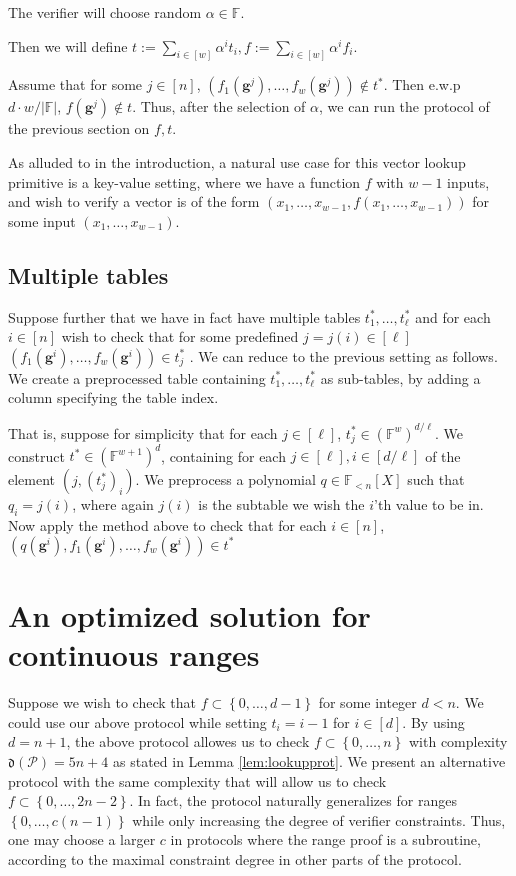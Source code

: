 \documentclass[11pt]{article} %
\newcommand{\F}{\ensuremath{\mathbb F}\xspace}
\newcommand{\defeq}{:=}
\newcommand{\set}[1]{\ensuremath{\left\{#1\right\}}\xspace}
\newcommand{\hgen}{\ensuremath{\mathbf{g}}\xspace}
\newcommand{\polysofdeg}[1]{\ensuremath{\F_{< #1}[X]}\xspace}
\newcommand{\prot}{\ensuremath{\mathscr{P}}\xspace}
\newcommand{\aggdeg}[1]{\ensuremath{\mathfrak{d}(#1)}\xspace}
\begin{document}
The verifier will choose random $\alpha \in \F$.

Then we will define $t\defeq \sum_{i\in [w]} \alpha^i t_i, f \defeq \sum_{i\in [w]} \alpha^i f_i$.

Assume that for some $j\in [n]$, $(f_1(\hgen^j),\ldots,f_w(\hgen^j))\notin t^*$.
Then e.w.p $d\cdot w/|\F|$, $f(\hgen^j)\notin t$.
Thus, after the selection of $\alpha$,
we can run the protocol of the previous section on $f,t$.

As alluded to in the introduction, a natural use case for this vector lookup primitive is a key-value setting, where we have a function $f$ with $w-1$ inputs,
and wish to verify a vector is of the form $(x_1,\ldots,x_{w-1},f(x_1,\ldots,x_{w-1}))$ for some input $(x_1,\ldots,x_{w-1})$.

\subsection{Multiple tables}
Suppose further that we have in fact have multiple tables $t^*_1,\ldots, t^*_\ell$
and for each $i\in [n]$ wish to check that for some predefined $j=j(i)\in [\ell]$  $(f_1(\hgen^i),\ldots,f_w(\hgen^i))\in t^*_j$ .
We can reduce to the previous setting as follows.
We create a preprocessed table containing $t^*_1,\ldots, t^*_\ell$ as sub-tables, by adding a column specifying the table index.

That is, suppose for simplicity that for each $j\in [\ell]$, $t^*_j\in (\F^{w})^{d/\ell}$.
We construct $t^*\in (\F^{w+1})^d$, 
containing for each $j\in [\ell], i\in [d/\ell]$ of the element
$(j,(t^*_j)_i)$.
We preprocess a polynomial $q\in \polysofdeg{n}$
such that $q_i =j(i)$, where again $j(i)$ is the subtable we wish the $i$'th value to be in.
Now apply the method above to check that for each $i\in [n]$,
$(q(\hgen^i),f_1(\hgen^i),\ldots,f_w(\hgen^i))\in t^*$

\section{An optimized solution for continuous ranges}\label{sec:ranges}
Suppose we wish to check that $f \subset \set{0,\ldots,d-1}$ for some integer $d< n$.
We could use our above protocol while setting $t_i = i-1$ for $i\in [d]$.
By using $d=n+1$, the above protocol allowes us to check $f\subset \set{0,\ldots,n}$ with complexity $\aggdeg{\prot}=5n+4$ as stated in Lemma \ref{lem:lookupprot}. 
We present an alternative protocol with the same complexity that will allow us to check $f\subset \set{0,\ldots,2n-2}$.
In fact, the protocol naturally generalizes for ranges $\set{0,\ldots,c(n-1)}$ while only increasing the degree of verifier constraints. Thus, one may choose a larger $c$ in protocols where the range proof is a subroutine, according to the maximal constraint degree in other parts of the protocol.
\end{document}
